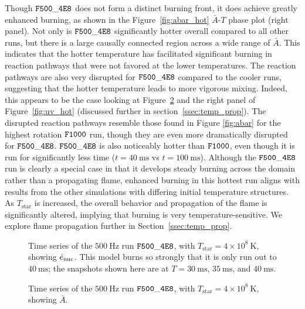 \documentclass[preprint,times,tighten]{aastex63}
\newcommand{\enucdot}{\dot{e}_{\rm nuc}}
\begin{document}
 Though $\tt{F500\_4E8}$ does not form a distinct burning front, it does achieve greatly enhanced burning, as shown in the Figure~\ref{fig:abar_hot} $\bar{A}$-$T$ phase plot (right panel). Not only is $\tt{F500\_4E8}$ significantly hotter overall compared to all other runs, but there is a large causally connected region across a wide range of $\bar{A}$. This indicates that the hotter temperature has facilitated significant burning in reaction pathways that were not favored at the lower temperatures. The reaction pathways are also very disrupted for $\tt{F500\_4E8}$ compared to the cooler runs, suggesting that the hotter temperature leads to more vigorous mixing. Indeed, this appears to be the case looking at Figure~\ref{fig:4e8_stacked_abar} and the right panel of Figure~\ref{fig:uv_hot} (discussed further in section~\ref{ssec:temp_prop}). The disrupted reaction pathways resemble those found in Figure \ref{fig:abar} for the highest rotation $\tt{F1000}$ run, though they are even more dramatically disrupted for $\tt{F500\_4E8}$. $\tt{F500\_4E8}$ is also noticeably hotter than $\tt{F1000}$, even though it is run for significantly less time ($t = 40~\mathrm{ms}$ vs $t = 100~\mathrm{ms}$). Although the $\tt{F500\_4E8}$ run is clearly a special case in that it develops steady burning across the domain rather than a propagating flame, enhanced burning in this hottest run aligns with results from the other simulations with differing initial temperature structures. As $T_{\mathrm{star}}$ is increased, the overall behavior and propagation of the flame is significantly altered, implying that burning is very temperature-sensitive. We explore flame propagation further in Section~\ref{ssec:temp_prop}.


\begin{figure}[t]
	\centering
	\caption{\label{fig:4e8_stacked_enuc} Time series of the $500~\mathrm{Hz}$ run $\tt{F500\_4E8}$, with $T_{\mathrm{star}} = 4 \times 10^8~\mathrm{K}$, showing $\enucdot$. This model burns so strongly that it is only run out to $40~\mathrm{ms}$; the snapshots shown here are at $T = 30~\mathrm{ms}$, $35~\mathrm{ms}$, and $40~\mathrm{ms}$.}
\end{figure}

\begin{figure}[t]
	\centering
	\caption{\label{fig:4e8_stacked_abar} Time series of the $500~\mathrm{Hz}$ run $\tt{F500\_4E8}$, with $T_{\mathrm{star}} = 4 \times 10^8~\mathrm{K}$, showing $\bar{A}$.}
\end{figure}
\end{document}
